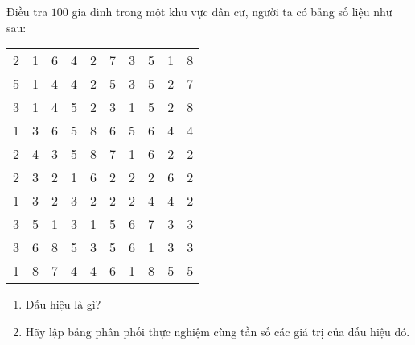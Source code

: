 \begin{vd}%
	Điều tra $100$ gia đình trong một khu vực dân cư, người ta có bảng số liệu như sau:
		\begin{center}
			\begin{tabular}{|c|c|c|c|c|c|c|c|c|c|}
				\hline
				2&1&6&4&2&7&3&5&1&8\\
				5&1&4&4&2&5&3&5&2&7\\
				3&1&4&5&2&3&1&5&2&8\\
				1&3&6&5&8&6&5&6&4&4\\
				2&4&3&5&8&7&1&6&2&2\\
				2&3&2&1&6&2&2&2&6&2\\
				1&3&2&3&2&2&2&4&4&2\\
				3&5&1&3&1&5&6&7&3&3\\
				3&6&8&5&3&5&6&1&3&3\\
				1&8&7&4&4&6&1&8&5&5\\
				\hline
			\end{tabular}
		\end{center}
	\begin{enumerate}
		\item Dấu hiệu là gì?
		\item Hãy lập bảng phân phối thực nghiệm cùng tần số các giá trị của dấu hiệu đó.
	\end{enumerate}
\end{vd}

